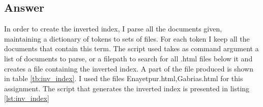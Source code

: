 \documentclass{article}
\begin{document}
		\subsection*{Answer}
		In order to create the inverted index, I parse all the documents given, maintaining a dictionary of tokens to sets of files. For each token I keep all the documents that contain this term. The script used takes as command argument a list of documents to parse, or a filepath to search for all .html files below it and creates a file containing the inverted index. A part of the file produced is shown in table \ref{tb:inv_index}. I used the files Enayetpur.html,Gabrias.html for this assignment. The script that generates the inverted index is presented in listing \ref{lst:inv_index}
		
\end{document}
